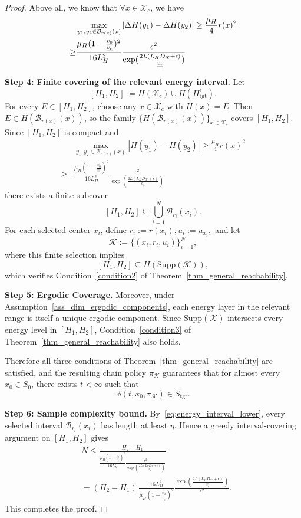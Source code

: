 \documentclass[letterpaper, 10 pt, conference]{ieeeconf}
\newcommand{\K}{\mathcal{K}}
\newcommand{\X}{\mathcal{X}}
\newcommand{\tgt}{\mathrm{tgt}}
\newcommand{\Supp}{\mathrm{Supp}}
\newcommand{\cB}{\mathcal{B}}
\begin{document}
\begin{proof}
Above all, we know that $\forall x \in \X_c$, we have
\begin{align}
& \max_{y_1,y_2\in \cB_{r(x)}(x)} |\Delta H(y_1)- \Delta H(y_2)| \ge \frac{\mu_{H}}{4}r(x)^2 \notag\\
\ge & \frac{\mu_{H} (1-\frac{v_0}{\underline{v_\epsilon}})^2}{16L_H^2}\frac{\epsilon^2}{\exp(\frac{2L(L_HD_{\mathcal{X}}+\epsilon)}{\underline{v_\epsilon}})} \label{eq:energy_interval_lower}
\end{align}

\noindent\textbf{Step 4: Finite covering of the relevant energy interval.}
Let \[
[H_1,H_2]:=H(\X_c)\cup H(H_{\tgt}^\epsilon).
\]
For every $E\in[H_1,H_2]$, choose any $x\in\X_c$ with $H(x)=E$.
Then $E\in H(\cB_{r(x)}(x))$, so the family $\{H(\cB_{r(x)}(x))\}_{x\in\X_c}$ covers $[H_1,H_2]$.
Since $[H_1,H_2]$ is compact and 
\begin{align*}
& \max_{y_1,y_2\in \cB_{r(x)}(x)} |H(y_1)-H(y_2)| \geq \frac{\mu_{H}}{4}r(x)^2\\
\ge & \frac{\mu_{H} (1-\frac{v_0}{\underline{v_\epsilon}})^2}{16L_H^2}\frac{\epsilon^2}{\exp(\frac{2L(L_HD_{\mathcal{X}}+\epsilon)}{\underline{v_\epsilon}})}
\end{align*} there exists a finite subcover
\[
[H_1,H_2]\subseteq \bigcup_{i=1}^N \cB_{r_i}(x_i).
\]
For each selected center $x_i$, define $r_i:=r(x_i), u_i:=u_{x_i},$ and let
\[
\K:=\{(x_i,r_i,u_i)\}_{i=1}^N,
\]
where this finite selection implies
\[
[H_1,H_2]\subseteq H(\Supp(\K)),
\]
which verifies Condition~\ref{condition2} of
Theorem~\ref{thm_general_reachability}.

\noindent\textbf{Step 5: Ergodic Coverage.}
Moreover, under Assumption~\ref{ass_dim_ergodic_components},
each energy layer in the relevant range is itself a unique ergodic component.
Since $\Supp(\K)$ intersects every energy level in $[H_1,H_2]$,
Condition~\ref{condition3} of
Theorem~\ref{thm_general_reachability} also holds.

Therefore all three conditions of
Theorem~\ref{thm_general_reachability} are satisfied, and the resulting
chain policy $\pi_{\K}$ guarantees that for almost every $x_0\in S_0$,
there exists $t<\infty$ such that
\[
\phi(t,x_0,\pi_{\K})\in S_{\tgt}.
\]

\noindent\textbf{Step 6: Sample complexity bound.}
By~\eqref{eq:energy_interval_lower}, every selected interval $\cB_{r_i}(x_i)$
has length at least $\eta$. Hence a greedy interval-covering argument on
$[H_1,H_2]$ gives
\begin{align*}
& N \le \frac{H_2-H_1}{\frac{\mu_{H} (1-\frac{v_0}{\underline{v_\epsilon}})^2}{16L_H^2}\frac{\epsilon^2}{\exp(\frac{2L(L_HD_{\mathcal{X}}+\epsilon)}{\underline{v_\epsilon}})}}\\
& =
(H_2-H_1)\,
\frac{16L_H^2}
{\mu_H\left(1-\frac{v_0}{\underline v_\epsilon}\right)^2}
\frac{
\exp\!\left(
\frac{2L(L_HD_{\X}+\epsilon)}{\underline v_\epsilon}
\right)}
{\epsilon^2}.
\end{align*}
This completes the proof.
\end{proof}
\end{document}
